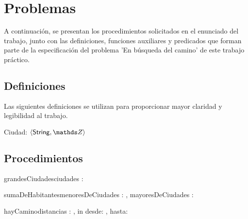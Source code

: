 \documentclass[10pt,a4paper]{article}
\newcommand{\ciudad}{\ensuremath{\langle \mathsf{String} , \ent \rangle}}
\begin{document}
\maketitle

\section{Problemas}
A continuación, se presentan los procedimientos solicitados en el enunciado del trabajo, junto con las definiciones, funciones auxiliares y predicados que forman parte de la especificación del problema 'En búsqueda del camino' de este trabajo práctico.

\subsection{Definiciones}
Las siguientes definiciones se utilizan para proporcionar mayor claridad y legibilidad al trabajo.

Ciudad:   \ciudad


\subsection{Procedimientos}


\begin{proc}{grandesCiudades}{\In ciudades : }{ }
\end{proc}

\begin{proc}{sumaDeHabitantes}{\In menoresDeCiudades : , \In mayoresDeCiudades : }{ }
\end{proc}

\begin{proc}{hayCamino}{\In distancias : \TLista{\TLista{\ent}}, in desde: \ent, hasta: \ent}{ \bool}
\end{proc}
\end{document}
